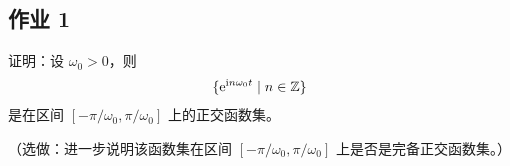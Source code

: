 \subsection{作业 1}

\begin{homework}
    证明：设 $\omega_0 > 0$，则
    \begin{align*}
        \{\mathrm{e}^{\mathrm{i} n\omega_0t} \mid n \in \mathbb{Z}\}
    \end{align*}
    是在区间 $[-\pi/\omega_0, \pi/\omega_0]$ 上的正交函数集。

    （选做：进一步说明该函数集在区间 $[-\pi/\omega_0, \pi/\omega_0]$ 上是否是完备正交函数集。）
\end{homework}
